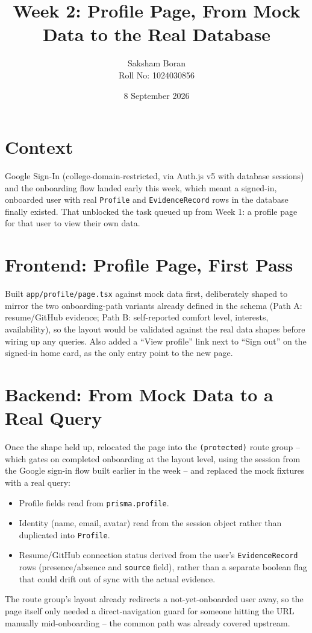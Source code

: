 \documentclass[11pt,a4paper]{article}
\title{\bfseries Week 2: Profile Page, From Mock Data to the
  Real Database}
\author{Saksham Boran \\ \small Roll No: 1024030856}
\date{8 September 2026}
\begin{document}
\maketitle

\section{Context}
Google Sign-In (college-domain-restricted, via Auth.js v5 with
database sessions) and the onboarding flow landed early this week,
which meant a signed-in, onboarded user with real \texttt{Profile}
and \texttt{EvidenceRecord} rows in the database finally existed.
That unblocked the task queued up from Week 1: a profile page for
that user to view their own data.

\section{Frontend: Profile Page, First Pass}
Built \texttt{app/profile/page.tsx} against mock data first,
deliberately shaped to mirror the two onboarding-path variants
already defined in the schema (Path A: resume/GitHub evidence;
Path B: self-reported comfort level, interests, availability), so
the layout would be validated against the real data shapes before
wiring up any queries. Also added a ``View profile'' link next to
``Sign out'' on the signed-in home card, as the only entry point to
the new page.

\section{Backend: From Mock Data to a Real Query}
Once the shape held up, relocated the page into the
\texttt{(protected)} route group -- which gates on completed
onboarding at the layout level, using the session from the Google
sign-in flow built earlier in the week -- and replaced the mock
fixtures with a real query:
\begin{itemize}[leftmargin=0.7cm]
  \item Profile fields read from \texttt{prisma.profile}.
  \item Identity (name, email, avatar) read from the session
    object rather than duplicated into \texttt{Profile}.
  \item Resume/GitHub connection status derived from the user's
    \texttt{EvidenceRecord} rows (presence/absence and
    \texttt{source} field), rather than a separate boolean flag
    that could drift out of sync with the actual evidence.
\end{itemize}
The route group's layout already redirects a not-yet-onboarded
user away, so the page itself only needed a direct-navigation guard
for someone hitting the URL manually mid-onboarding -- the common
path was already covered upstream.
\end{document}
